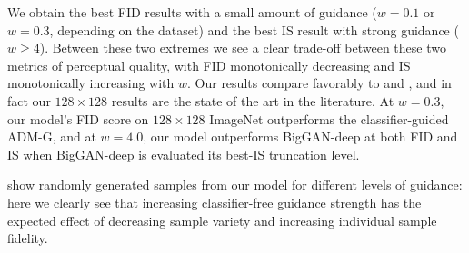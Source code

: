 \documentclass{article} %
\begin{document}
We obtain the best FID results with a small amount of guidance ($w = 0.1$ or $w=0.3$, depending on the dataset) and the best IS result with strong guidance ($w \geq 4$). Between these two extremes we see a clear trade-off between these two metrics of perceptual quality, with FID monotonically decreasing and IS monotonically increasing with $w$. Our results compare favorably to \citet{dhariwal2021diffusion} and \citet{ho2021cascaded}, and in fact our $128\times128$ results are the state of the art in the literature. At $w=0.3$, our model's FID score on $128\times128$ ImageNet outperforms the classifier-guided ADM-G, and at $w=4.0$, our model outperforms BigGAN-deep at both FID and IS when BigGAN-deep is evaluated its best-IS truncation level.



 show randomly generated samples from our model for different levels of guidance: here we clearly see that increasing classifier-free guidance strength has the expected effect of decreasing sample variety and increasing individual sample fidelity.
\end{document}
